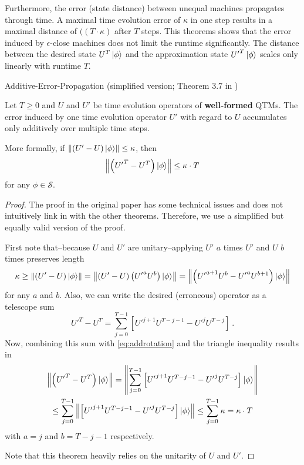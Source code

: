 Furthermore, the error (state distance) between unequal machines propagates through time.
A maximal time evolution error of $\kappa$ in one step results in a maximal distance of $((T\cdot\kappa)$ after $T$ steps.
This theorems shows that the error induced by $\epsilon$-close machines does not limit the runtime significantly.
The distance between the desired state $U^T\ket{\phi}$ and the approximation state ${U'}^T\ket{\phi}$ scales only linearly with runtime $T$.
\begin{theorem}
\label{th:adde}
Additive-Error-Propagation (simplified version; Theorem 3.7 in \cite{bernstein_vazirani_1997})

Let $T\geq0$ and $U$ and $U'$ be time evolution operators of \textbf{well-formed} \acp{QTM}.
The error induced by one time evolution operator $U'$ with regard to $U$ accumulates only additively over multiple time steps.

More formally, if $\left\lVert(U'-U)\ket{\phi}\right\rVert\leq\kappa$, then
\begin{equation}
    \left\lVert\left({U'}^T-U^T\right)\ket{\phi}\right\rVert\leq\kappa\cdot T
\end{equation}
for any $\phi\in\mathcal{S}$.

\begin{proof}
The proof in the original paper \cite{bernstein_vazirani_1997} has some technical issues and does not intuitively link in with the other theorems.
Therefore, we use a simplified but equally valid version of the proof.

First note that--because $U$ and $U'$ are unitary--applying $U'$ $a$ times $U'$ and $U$ $b$ times preserves length
\begin{equation}
\label{eq:addrotation}
    \kappa
    \geq\left\lVert(U'-U)\ket{\phi}\right\rVert
    =\left\lVert\left(U'-U\right)\left({U'}^aU^b\right)\ket{\phi}\right\rVert
    =\left\lVert\left({U'}^{a+1}U^b-{U'}^aU^{b+1}\right)\ket{\phi}\right\rVert
\end{equation}
for any $a$ and $b$.
Also, we can write the desired (erroneous) operator as a telescope sum
\begin{equation}
    {U'}^T-U^T
    =\sum_{j=0}^{T-1}\left[{U'}^{j+1}U^{T-j-1}-{U'}^jU^{T-j}\right]
    \ .
\end{equation}
Now, combining this sum with \cref{eq:addrotation} and the triangle inequality results in
\begin{multline}
    \left\lVert\left({U'}^T-U^T\right)\ket{\phi}\right\rVert
    =\left\lVert\sum_{j=0}^{T-1}\left[{U'}^{j+1}U^{T-j-1}-{U'}^jU^{T-j}\right]\ket{\phi}\right\rVert
    \\
    \leq\sum_{j=0}^{T-1}\left\lVert\left[{U'}^{j+1}U^{T-j-1}-{U'}^jU^{T-j}\right]\ket{\phi}\right\rVert
    \leq\sum_{j=0}^{T-1}\kappa
    =\kappa\cdot T
\end{multline}
with $a=j$ and $b=T-j-1$ respectively.

Note that this theorem heavily relies on the unitarity of $U$ and $U'$.
\end{proof}
\end{theorem}

